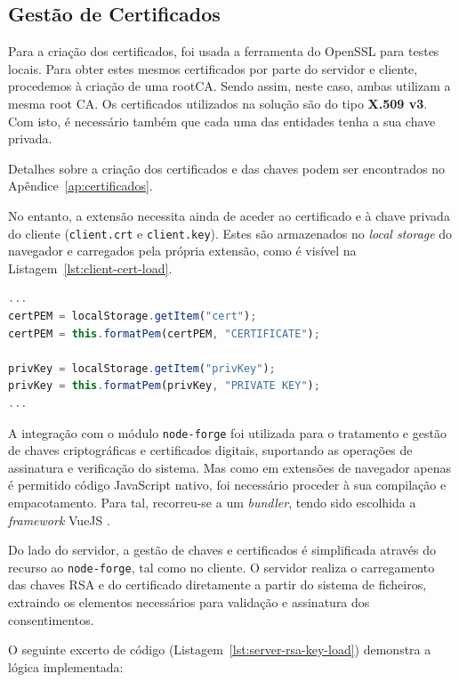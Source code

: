 \subsection{Gestão de Certificados}
Para a criação dos certificados, foi usada a ferramenta do OpenSSL para testes locais. Para obter estes mesmos certificados por parte do servidor e cliente, procedemos à criação de uma rootCA. Sendo assim, neste caso, ambas utilizam a mesma root CA. Os certificados utilizados na solução são do tipo \textbf{X.509 v3}. Com isto, é necessário também que cada uma das entidades tenha a sua chave privada.

Detalhes sobre a criação dos certificados e das chaves podem ser encontrados no Apêndice~\ref{ap:certificados}.

No entanto, a extensão necessita ainda de aceder ao certificado e à chave privada do cliente (\texttt{client.crt} e \texttt{client.key}). Estes são armazenados no \textit{local storage} do navegador e carregados pela própria extensão, como é visível na Listagem~\ref{lst:client-cert-load}.

\begin{lstlisting}[language=Javascript, caption={Carregamento do certificado e da chave privada do cliente a partir do \textit{local storage}}, label={lst:client-cert-load}]
...
certPEM = localStorage.getItem("cert");
certPEM = this.formatPem(certPEM, "CERTIFICATE");

privKey = localStorage.getItem("privKey");
privKey = this.formatPem(privKey, "PRIVATE KEY");
...
\end{lstlisting}

A integração com o módulo \texttt{node-forge} foi utilizada para o tratamento e gestão de chaves criptográficas e certificados digitais, suportando as operações de assinatura e verificação do sistema. Mas como em extensões de navegador apenas é permitido código JavaScript nativo, foi necessário proceder à sua compilação e empacotamento. Para tal, recorreu-se a um \textit{bundler}, tendo sido escolhida a \textit{framework} VueJS \citep{VueJS}.

Do lado do servidor, a gestão de chaves e certificados é simplificada através do recurso ao \texttt{node-forge}, tal como no cliente. O servidor realiza o carregamento das chaves RSA e do certificado diretamente a partir do sistema de ficheiros, extraindo os elementos necessários para validação e assinatura dos consentimentos.

O seguinte excerto de código (Listagem~\ref{lst:server-rsa-key-load}) demonstra a lógica implementada:

